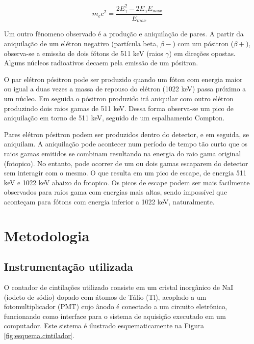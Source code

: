 \documentclass[a4paper, 11pt, notitlepage]{article}
\numberwithin{equation}{section}  %
\begin{document}
\begin{equation}
 m_e c^2 = \frac{2E_{\gamma}^{2} - 2E_{\gamma}E_{max}}{E_{max}}
 \label{eq:massaeletron}
\end{equation}

Um outro fênomeno observado é a produção e aniquilação de pares. A partir da aniquilação de um elétron negativo (partícula beta, $\beta-$) com um pósitron ($\beta+$), observa-se a emissão de dois fótons de 511 keV (raios $\gamma$) em direções opostas. Alguns núcleos radioativos decaem pela emissão de um pósitron.

O par elétron pósitron pode ser produzido quando um fóton com energia maior ou igual a duas vezes a massa de repouso do elétron (1022 keV) passa próximo a um núcleo. Em seguida o pósitron produzido irá aniquilar com outro elétron produzindo dois raios gamas de 511 keV. Dessa forma observa-se um pico de aniquilação em torno de 511 keV, seguido de um espalhamento Compton.

Pares elétron pósitron podem ser produzidos dentro do detector, e em seguida, se aniquilam. A aniquilação pode acontecer num período de tempo tão curto que os raios gamas emitidos se combinam resultando na energia do raio gama original (fotopico). No entanto, pode ocorrer de um ou dois gamas escaparem do detector sem interagir com o mesmo. O que resulta em um pico de escape, de energia 511 keV e 1022 keV abaixo do fotopico. Os picos de escape podem ser mais facilmente observados para raios gama com energias mais altas, sendo impossível que aconteçam para fótons com energia inferior a 1022 keV, naturalmente.

\section{\label{sec:metodologia}Metodologia}

\subsection{Instrumentação utilizada}
O contador de cintilações utilizado consiste em um cristal inorgânico de NaI (iodeto de sódio) dopado com átomos de Tálio (Tl), acoplado a um fotomultiplicador (PMT) cujo ânodo é conectado a um circuito eletrônico, funcionando como interface para o sistema de aquisição executado em um computador. Este sistema é ilustrado esquematicamente na Figura \ref{fig:esquema.cintilador}.
\end{document}
